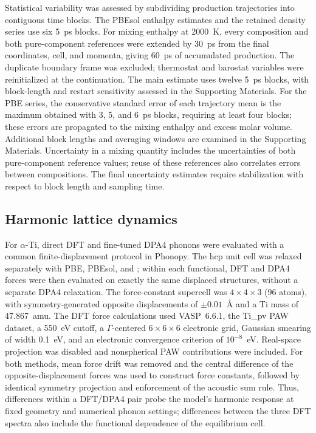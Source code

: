 Statistical variability was assessed by subdividing production trajectories into contiguous time blocks.
The PBEsol enthalpy estimates and the retained density series use six 5~ps blocks.
For \rscan{} mixing enthalpy at 2000~K, every composition and both pure-component references were extended by 30~ps from the final coordinates, cell, and momenta, giving 60~ps of accumulated production.
The duplicate boundary frame was excluded; thermostat and barostat variables were reinitialized at the continuation.
The main estimate uses twelve 5~ps blocks, with block-length and restart sensitivity assessed in the Supporting Materials.
For the PBE series, the conservative standard error of each trajectory mean is the maximum obtained with 3, 5, and 6~ps blocks, requiring at least four blocks; these errors are propagated to the mixing enthalpy and excess molar volume.
Additional block lengths and averaging windows are examined in the Supporting Materials.
Uncertainty in a mixing quantity includes the uncertainties of both pure-component reference values; reuse of these references also correlates errors between compositions.
The final uncertainty estimates require stabilization with respect to block length and sampling time.

\subsection{Harmonic lattice dynamics}
\label{sec:phonons}

For $\alpha$-Ti, direct DFT and fine-tuned DPA4 phonons were evaluated with a common finite-displacement protocol in Phonopy.\cite{Togo2015}
The hcp unit cell was relaxed separately with PBE, PBEsol, and \rscan{}; within each functional, DFT and DPA4 forces were then evaluated on exactly the same displaced structures, without a separate DPA4 relaxation.
The force-constant supercell was $4\times4\times3$ (96 atoms), with symmetry-generated opposite displacements of $\pm0.01$~\AA{} and a Ti mass of 47.867~amu.
The DFT force calculations used VASP~6.6.1, the Ti\_pv PAW dataset, a 550~eV cutoff, a $\Gamma$-centered $6\times6\times6$ electronic grid, Gaussian smearing of width 0.1~eV, and an electronic convergence criterion of $10^{-8}$~eV.
Real-space projection was disabled and nonspherical PAW contributions were included.
For both methods, mean force drift was removed and the central difference of the opposite-displacement forces was used to construct force constants, followed by identical symmetry projection and enforcement of the acoustic sum rule.
Thus, differences within a DFT/DPA4 pair probe the model's harmonic response at fixed geometry and numerical phonon settings; differences between the three DFT spectra also include the functional dependence of the equilibrium cell.

